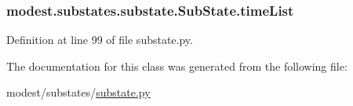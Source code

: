 \subsubsection[{\texorpdfstring{time\+List}{timeList}}]{\setlength{\rightskip}{0pt plus 5cm}modest.\+substates.\+substate.\+Sub\+State.\+time\+List}\hypertarget{classmodest_1_1substates_1_1substate_1_1SubState_a9b7a77e3b7dc14fc85962cda84e8cd58}{}\label{classmodest_1_1substates_1_1substate_1_1SubState_a9b7a77e3b7dc14fc85962cda84e8cd58}


Definition at line 99 of file substate.\+py.



The documentation for this class was generated from the following file\+:\begin{DoxyCompactItemize}
\item 
modest/substates/\hyperlink{substate_8py}{substate.\+py}\end{DoxyCompactItemize}
